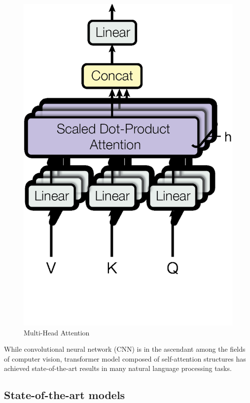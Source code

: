 \begin{minipage}[ht]{.35\textwidth}
\begin{figure}[H]
        \includegraphics[width=.9\textwidth]{literature/imgs/ext-attention-multihead.png}
        \vspace*{-.4cm}
        \caption{Multi-Head Attention \cite{vaswani2017attention}}
        \label{fig:ext-attention-multihead}
    \end{figure}
\end{minipage}

\citet{vaswani2017attention}

While convolutional neural network (CNN) is in the ascendant among the fields of computer vision, transformer model composed of self-attention structures has achieved state-of-the-art results in many natural language processing tasks.

\citet{devlin2019bert}


\subsection{State-of-the-art models}

\citet{srinivas2021bottleneck}

\citet{wang2021pyramid}

\citet{dai2021coatnet}
